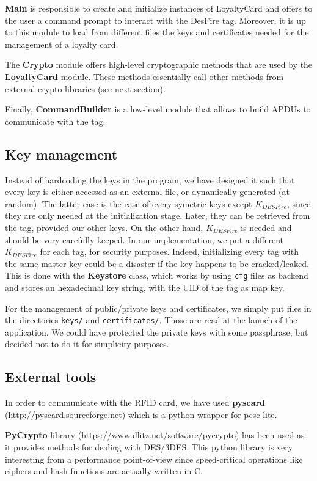 \documentclass[a4paper,11pt,oneside]{article}
\begin{document}
\textbf{Main} is responsible to create and initialize instances of LoyaltyCard
and offers to the user a command prompt to interact with the DesFire tag.
Moreover, it is up to this module to load from different files the keys and
certificates needed for the management of a loyalty card. 

The \textbf{Crypto} module offers high-level cryptographic methods that are used
by the \textbf{LoyaltyCard} module. These methods essentially call other methods
from external crypto libraries (see next section). 

Finally, \textbf{CommandBuilder} is a low-level module that allows to build
APDUs to communicate with the tag. 


\subsection{Key management}
Instead of hardcoding the keys in the program, we have designed it such that
every key is either accessed as an external file, or dynamically generated (at
random). The latter case is the case of every symetric keys except $K_{DESFire}$,
since they are only needed at the initialization stage. Later, they can be
retrieved from the tag, provided our other keys. On the other hand,
$K_{DESFire}$ is needed and should be very carefully keeped. In our
implementation, we put a different $K_{DESFire}$ for each tag, for security
purposes. Indeed, initializing every tag with the same master key could be a
disaster if the key happens to be cracked/leaked. This is done with the
\textbf{Keystore} class, which works by using \texttt{cfg} files as backend and
stores an hexadecimal key string, with the UID of the tag as map key.

For the management of public/private keys and certificates, we simply put files
in the directories \texttt{keys/} and \texttt{certificates/}. Those are read at
the launch of the application. We could have
protected the private keys with some passphrase, but decided not to do it for
simplicity purposes.


\subsection{External tools}

In order to communicate with the RFID card, we have used \textbf{pyscard} (\url{http://pyscard.sourceforge.net}) which is a python wrapper for pcsc-lite. 

\textbf{PyCrypto} library (\url{https://www.dlitz.net/software/pycrypto}) has
been used as it provides methods for dealing with DES/3DES. This python library
is very interesting from a performance point-of-view since speed-critical
operations like ciphers and hash functions are actually written in C. 
\end{document}
